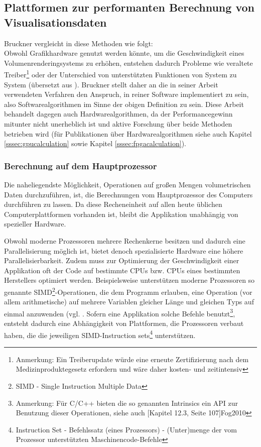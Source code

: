 \documentclass[pdftex,a4paper,titlepage,12pt]{scrartcl}
\newtheorem[L]{boxedDefinition}{Definition}
\begin{document}
\subsection{Plattformen zur performanten Berechnung von Visualisationsdaten}\label{ssec:platforms}
Bruckner vergleicht in \cite{Brucker2004} diese Methoden wie folgt:\\
Obwohl Grafikhardware genutzt werden könnte, um die Geschwindigkeit eines Volumenrenderingsystems zu erhöhen, entstehen dadurch Probleme wie veraltete Treiber\footnote{Anmerkung: Ein Treiberupdate würde eine erneute Zertifizierung nach dem Medizinproduktegesetz erfordern und wäre daher kosten- und zeitintensiv} oder der Unterschied von unterstützten Funktionen von System zu System (übersetzt aus \cite[Kapitel 3.1.1, Seite 17, Paragraph \glqq Pure Software \grqq]{Bruckner2004}).
Bruckner stellt daher an die in seiner Arbeit verwendeten Verfahren den Anspruch, in reiner Software implementiert zu sein, also Softwarealgorithmen im Sinne der obigen Definition zu sein. Diese Arbeit behandelt dagegen auch Hardwarealgorithmen, da der Performancegewinn mitunter nicht unerheblich ist und aktive Forschung über beide Methoden betrieben wird (für Publikationen über Hardwarealgorithmen siehe auch Kapitel \ref{sssec:gpucalculation} sowie Kapitel \ref{sssec:fpgacalculation}).

\subsubsection{Berechnung auf dem Hauptprozessor}\label{sssec:cpucalculation}
Die naheliegendste Möglichkeit, Operationen auf großen Mengen volumetrischen Daten durchzuführen, ist, die Berechnungen vom Hauptprozessor des Computers durchführen zu lassen. Da diese Recheneinheit auf allen heute üblichen Computerplattformen vorhanden ist, bleibt die Applikation unabhängig von spezieller Hardware.

Obwohl moderne Prozessoren mehrere Rechenkerne besitzen und dadurch eine Parallelisierung möglich ist, bietet denoch spezialisierte Hardware eine höhere Parallelisierbarkeit. Zudem muss zur Optimierung der Geschwindigkeit einer Applikation oft der Code auf bestimmte CPUs bzw. CPUs eines bestimmten Herstellers optimiert werden. Beispielsweise unterstützen moderne Prozessoren so genannte SIMD\footnote{SIMD - Single Instruction Multiple Data}-Operationen, die dem Programm erlauben, eine Operation (vor allem arithmetische) auf mehrere Variablen gleicher Länge und gleichen Typs auf einmal anzuwenden (vgl. \cite[Kapitel 12, Seite 103]{Fog2010}. Sofern eine Applikation solche Befehle benutzt\footnote{Anmerkung: Für C/C++ bieten die so genannten Intrinsics ein API zur Benutzung dieser Operationen, siehe auch [Kapitel 12.3, Seite 107]{Fog2010}}, entsteht dadurch eine Abhängigkeit von Plattformen, die Prozessoren verbaut haben, die die jeweiligen SIMD-Instruction sets\footnote{Instruction Set - Befehlssatz (eines Prozessors) - (Unter)menge der vom Prozessor unterstützten Maschinencode-Befehle} unterstützen.
\end{document}

